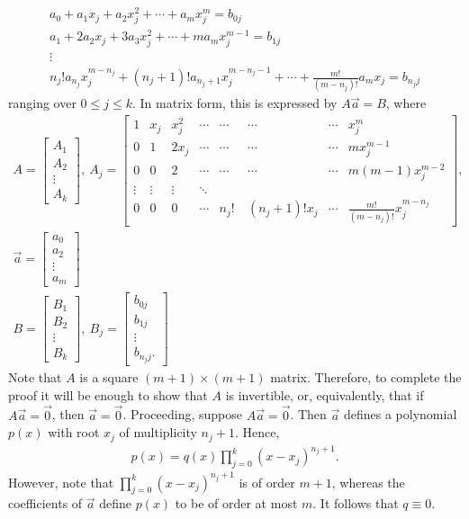 \documentclass[12pt,reqno]{amsart}
\numberwithin{equation}{section}  %
\numberwithin{figure}{section}
\theoremstyle{plain}
\theoremstyle{definition}
\theoremstyle{remark}
\begin{document}
\begin{gather*}
	a_{0}+a_{1}x_{j} + a_{2}x_{j}^2 +\cdots+a_{m}x_{j}^{m} = b_{0 j}
	\\
	a_{1} + 2 a_{2}x_{j} + 3a_{3}x_{j}^2 + \cdots+ m a_{m}x_{j}^{m-1} =
	b_{1j}
	\\
	\vdots
	\\
	n_j! a_{ n_{j}} x_{j}^{m -n_{j}} +
	(n_j + 1)! a_{n_{j}+1}
	x_{j}^{m - n_{j}-1} + \cdots + \frac{m!}{(m-n_j)!} a_{m}x_{j} = b_{n_j j}
\end{gather*}
ranging over $0 \le j \le k$. In matrix form, this is expressed by $A\vec{a}=B$, where
%
%
%
%
\begin{gather*}
		A= \begin{bmatrix}
		A_1
		\\
		A_2
		\\
		\vdots
		\\
		A_k
	\end{bmatrix}
	, \ A_j=\begin{bmatrix}
		1 & x_{j} & x_{j}^{2} & \cdots &\cdots &\cdots & \cdots &x_{j}^{m}\\
	0 &1 &2x_{j} & \cdots &\cdots &\cdots &\cdots &mx_{j}^{m-1}\\
	0 &0 &2 & \cdots &\cdots &\cdots &\cdots &m(m-1)x_{j}^{m-2}\\
	\vdots & \vdots &\vdots &\ddots &\\
	0 &0 &0 &\cdots & n_j! \  & (n_j + 1)! x_j & \cdots &\frac{m!}{(m-n_{j})!} x_j^{m -n_{j}}
\end{bmatrix},
\\
	 \vec{a}=\begin{bmatrix}
		a_{0}\\
	a_{2}\\
	\vdots\\
	a_{m}
\end{bmatrix}
\\
 B = \begin{bmatrix}
	B_1\\
	B_2\\
	\vdots \\
	B_k
\end{bmatrix}
, \ B_j=
	\begin{bmatrix}
	b_{0j}\\
	b_{1j}\\
	\vdots \\
	b_{n_j j}.
\end{bmatrix}
\end{gather*}
%
%
%
%
Note that $A$ is a square $(m+1) \times (m+1)$ matrix. Therefore, to complete
the proof it will be enough to show that $A$ is invertible, or, equivalently,
that if $A \vec{a}=\vec{0}$, then $\vec{a} = \vec{0}$. Proceeding, suppose
$A \vec{a}=\vec{0}$. Then $\vec{a}$ defines a polynomial $p(x)$ with root $x_j$ of
multiplicity $n_j +1$. Hence,
%
%
\begin{equation*}
	\begin{split}
		p(x) = q(x) \prod_{j=0}^{k}(x-x_{j})^{n_{j}+1}.
	\end{split}
\end{equation*}
%
%
However, note that $\prod_{j=0}^{k}(x-x_{j})^{n_{j}+1}$ is of order $m+1$,
whereas the coefficients of $\vec{a}$ define $p(x)$ to be of order at most $m$.
It follows that $q \equiv 0$. \qquad \qedsymbol
%
%
\end{document}
